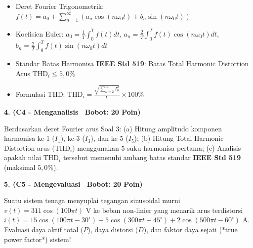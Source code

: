 \documentclass[10pt,a4paper]{article}
\begin{document}
\vfill

\begin{tcolorbox}[colback=unibblue!3,colframe=unibblue,colbacktitle=unibblue,coltitle=white,boxrule=0.6pt,arc=2pt,left=6pt,right=6pt,top=3pt,bottom=3pt,title=\textbf{\scriptsize FORMULA RUJUKAN TEKNIS \& STANDAR INDUSTRI TERKAIT}]
  \scriptsize
  \begin{itemize}[leftmargin=*, nosep]
  \item Deret Fourier Trigonometrik: $f(t) = a_0 + \sum_{n=1}^\infty \left( a_n \cos(n\omega_0 t) + b_n \sin(n\omega_0 t) \right)$
  \item Koefisien Euler: $a_0 = \frac{1}{T}\int_0^T f(t) dt$, $a_n = \frac{2}{T}\int_0^T f(t)\cos(n\omega_0 t) dt$, $b_n = \frac{2}{T}\int_0^T f(t)\sin(n\omega_0 t) dt$
  \item Standar Batas Harmonisa \textbf{IEEE Std 519}: Batas Total Harmonic Distortion Arus $\text{THD}_i \le 5{,}0\%$
  \item Formulasi THD: $\text{THD}_i = \frac{\sqrt{\sum_{n=2}^\infty I_n^2}}{I_1} \times 100\%$
\end{itemize}
\end{tcolorbox}

\newpage

\par
\vspace{1mm}

\noindent\textbf{4. (C4 - Menganalisis \textbar\ Bobot: 20 Poin)}\par\vspace{0.8mm}
{\footnotesize Berdasarkan deret Fourier arus Soal 3: (a) Hitung amplitudo komponen harmonisa ke-1 ($I_1$), ke-3 ($I_3$), dan ke-5 ($I_5$); (b) Hitung Total Harmonic Distortion arus ($\text{THD}_i$) menggunakan 5 suku harmonisa pertama; (c) Analisis apakah nilai $\text{THD}_i$ tersebut memenuhi ambang batas standar \textbf{IEEE Std 519} (maksimal $5{,}0\%$).}\par

\vspace{3.5mm}

\noindent\textbf{5. (C5 - Mengevaluasi \textbar\ Bobot: 20 Poin)}\par\vspace{0.8mm}
{\footnotesize Suatu sistem tenaga menyuplai tegangan sinusoidal murni $v(t) = 311 \cos(100\pi t)\text{ V}$ ke beban non-linier yang menarik arus terdistorsi $i(t) = 15 \cos(100\pi t - 30^\circ) + 5 \cos(300\pi t - 45^\circ) + 2 \cos(500\pi t - 60^\circ)\text{ A}$. Evaluasi daya aktif total ($P$), daya distorsi ($D$), dan faktor daya sejati (*true power factor*) sistem!}\par
\end{document}
